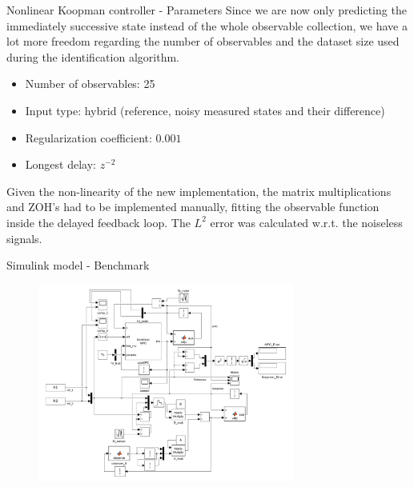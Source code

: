 \documentclass{beamer}
\begin{document}
\begin{frame}{Nonlinear Koopman controller - Parameters}
    Since we are now only predicting the immediately successive state instead of the whole observable collection, we have a lot more freedom regarding the number of observables and the dataset size used during the identification algorithm.

    \begin{itemize}
        \item Number of observables: 25
        \item Input type: hybrid (reference, noisy measured states and their difference)
        \item Regularization coefficient: $0.001$
        \item Longest delay: $z^{-2}$
    \end{itemize}

    Given the non-linearity of the new implementation, the matrix multiplications and ZOH's had to be implemented manually, fitting the observable function inside the delayed feedback loop. The $L^2$ error was calculated w.r.t. the noiseless signals.
\end{frame}

\begin{frame}{Simulink model - Benchmark}
    \begin{figure}
        \centering
        \includegraphics[width=0.75\textwidth]{Simulink_Koopman.png}
    \end{figure}
\end{frame}
\end{document}
